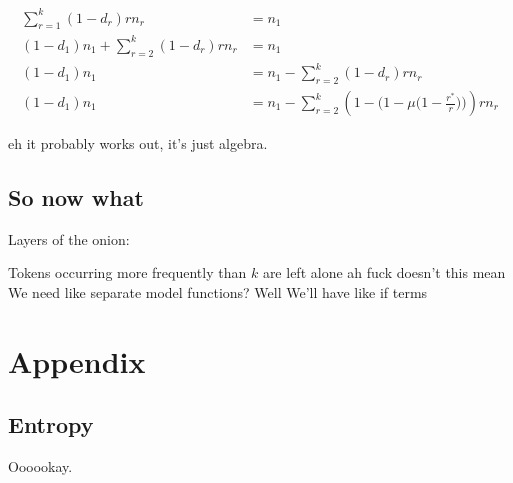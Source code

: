 \documentclass{article}
\begin{document}
		\begin{align}
			\sum^k_{r=1} (1-d_r) r n_r &= n_1\\
			(1-d_1)  n_1 + \sum^k_{r=2} (1-d_r) r n_r &= n_1\\
			(1-d_1)  n_1  &= n_1 - \sum^k_{r=2} (1-d_r) r n_r\\
			(1-d_1)  n_1  &= n_1 - \sum^k_{r=2} (1-\bigg( 1-\mu\bigg(1-\frac{r^*}{r} \bigg)\bigg)) r n_r
		\end{align}
		
		eh it probably works out, it's just algebra. 
		
	\subsection{So now what}
	
		Layers of the onion:
		
		Tokens occurring more frequently than $k$ are left alone ah fuck doesn't this mean We need like separate model functions? Well We'll have like if terms
		
		
		
		
		
		
		
		
		
		
		
		
		
		
		
		
		
		
		
		
		
		
		
		
		
		
		
		
		
		
		
		
		
		
		
		
		
		
		
		
		
		
		
		

\newpage\phantom{a}
\newpage		
\section{Appendix}

	\subsection{Entropy}
	
		Oooookay.
		
\end{document}
